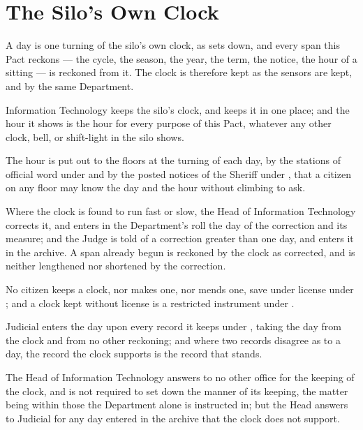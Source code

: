 \section{The Silo's Own Clock}
\label{sec:it:silos-own-clock}

A day is one turning of the silo's own clock, as  sets down, and every span this Pact reckons --- the cycle, the season, the year, the term, the notice, the hour of a sitting --- is reckoned from it. The clock is therefore kept as the sensors are kept, and by the same Department.

\begin{clauses}
\item Information Technology keeps the silo's clock, and keeps it in one place; and the hour it shows is the hour for every purpose of this Pact, whatever any other clock, bell, or shift-light in the silo shows.
\item The hour is put out to the floors at the turning of each day, by the stations of official word under  and by the posted notices of the Sheriff under , that a citizen on any floor may know the day and the hour without climbing to ask.
\item Where the clock is found to run fast or slow, the Head of Information Technology corrects it, and enters in the Department's roll the day of the correction and its measure; and the Judge is told of a correction greater than one day, and enters it in the archive. A span already begun is reckoned by the clock as corrected, and is neither lengthened nor shortened by the correction.
\item No citizen keeps a clock, nor makes one, nor mends one, save under license under ; and a clock kept without license is a restricted instrument under .
\item Judicial enters the day upon every record it keeps under , taking the day from the clock and from no other reckoning; and where two records disagree as to a day, the record the clock supports is the record that stands.
\item The Head of Information Technology answers to no other office for the keeping of the clock, and is not required to set down the manner of its keeping, the matter being within those the Department alone is instructed in; but the Head answers to Judicial for any day entered in the archive that the clock does not support.
\end{clauses}
